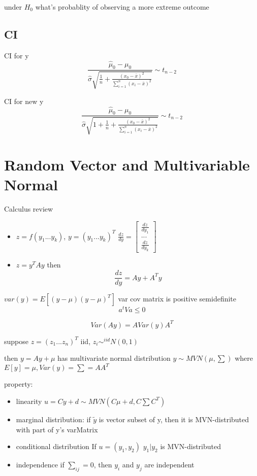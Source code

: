 \documentclass[10pt]{article}
\theoremstyle{break}
\begin{document}
under $H_0$ what's probablity of observing a more extreme outcome

\subsection{CI}
CI for y
$$\frac{\hat\mu_0-\mu_0}{\hat\sigma\sqrt{\frac{1}{n}+\frac
{(x_0-\bar x)^2}{\sum^n_{i=1}(x_i-\bar x)^2}}}\sim t_{n-2}$$

CI for new y
$$\frac{\hat\mu_0-\mu_0}{\hat\sigma\sqrt{1+\frac{1}{n}+\frac
{(x_0-\bar x)^2}{\sum^n_{i=1}(x_i-\bar x)^2}}}\sim t_{n-2}$$

\section{Random Vector and Multivariable Normal}
    Calculus review 
     \begin{itemize}
         \item $z=f(y_1 ... y_k)$, $y=(y_1... y_k)^T$ 
         $\frac{dz}{dy}=
         \begin{bmatrix}
             \frac{dz}{dy_1}\\...\\\frac{dz}{dy_k}
         \end{bmatrix}$
         \item $z=y^TAy$ then $$\frac{dz}{dy}=Ay+A^Ty$$
     \end{itemize}
     $var(y)=E[(y-\mu)(y-\mu)^T]$
     var cov matrix is positive semidefinite 
     $$a^tVa\leq 0$$

     $$Var(Ay)=A Var(y) A^T$$

     suppose $z=(z_1...z_n)^T$ iid, $z_i \sim^{iid}N(0,1)$

     then $y=Ay+\mu$ has multivariate normal distribution 
     $y\sim MVN(\mu,\sum)$ where $E[y]=\mu, Var(y)=\sum=AA^T$

     property: 
     \begin{itemize}
         \item linearity 
     $u=Cy+d\sim MVN(C\mu+d, C\sum C^T)$

        \item marginal distribution: if $\tilde y$ is vector subset of y, then it is MVN-distributed with 
        part of y's varMatrix 
        \item conditional distribution If $u=(y_1,y_2)$ $y_1|y_2$ is MVN-distributed 
        \item independence if $\sum_{ij}=0$, then $y_i$ and $y_j$ are independent 
     \end{itemize}
\end{document}

